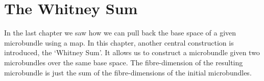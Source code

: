 \chapter{The Whitney Sum}\label{chapter::whitney}
\begin{myparagraph}
    In the last chapter we saw how we can pull back the base space of a given microbundle using a map.
    In this chapter, another central construction is introduced, the `Whitney Sum'.
    It allows us to construct a microbundle given two microbundles over the same base space.
    The fibre-dimension of the resulting microbundle is just the sum of the fibre-dimensions of the initial microbundles.
\end{myparagraph}


